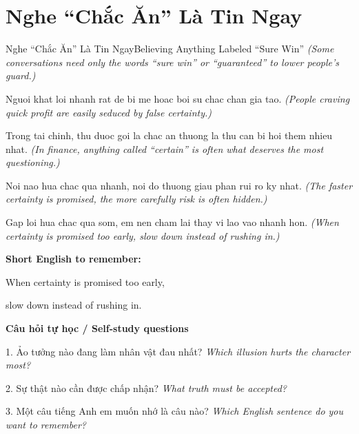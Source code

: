 \section{Nghe “Chắc Ăn” Là Tin Ngay}
\begin{truyen}{Nghe “Chắc Ăn” Là Tin Ngay}{Believing Anything Labeled “Sure Win”}
\textit{(Some conversations need only the words “sure win” or “guaranteed” to lower people’s guard.)}

Nguoi khat loi nhanh rat de bi me hoac boi su chac chan gia tao.
\textit{(People craving quick profit are easily seduced by false certainty.)}

Trong tai chinh, thu duoc goi la chac an thuong la thu can bi hoi them nhieu nhat.
\textit{(In finance, anything called “certain” is often what deserves the most questioning.)}

Noi nao hua chac qua nhanh, noi do thuong giau phan rui ro ky nhat.
\textit{(The faster certainty is promised, the more carefully risk is often hidden.)}

\end{truyen}

\begin{baihoc}
Gap loi hua chac qua som, em nen cham lai thay vi lao vao nhanh hon.
\textit{(When certainty is promised too early, slow down instead of rushing in.)}
\end{baihoc}

\begin{ghinhoanh}
\textbf{Short English to remember:}

When certainty is promised too early,

slow down instead of rushing in.

\end{ghinhoanh}

\begin{tuhocnhanh}
\textbf{Câu hỏi tự học / Self-study questions}

1. Ảo tưởng nào đang làm nhân vật đau nhất? \textit{Which illusion hurts the character most?}

2. Sự thật nào cần được chấp nhận? \textit{What truth must be accepted?}

3. Một câu tiếng Anh em muốn nhớ là câu nào? \textit{Which English sentence do you want to remember?}
\end{tuhocnhanh}
\ngancach

